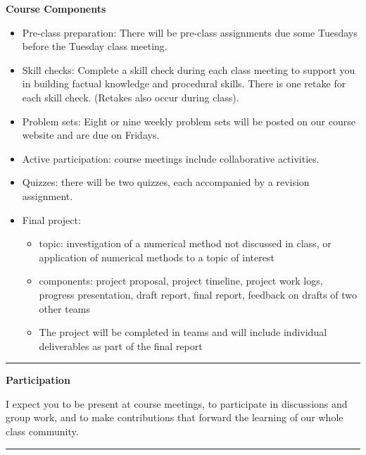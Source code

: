\documentclass[12pt,letterpaper]{exam}
\begin{document}
\noindent\textbf{Course Components}

\begin{itemize}
\itemsep0pt
    \item Pre-class preparation:  There will be pre-class assignments due some Tuesdays before the Tuesday class meeting.
    \item Skill checks: Complete a skill check during each class meeting to support you in building factual knowledge and procedural skills.  There is one retake for each skill check.  (Retakes also occur during class).
    \item Problem sets: Eight or nine weekly problem sets will be posted on our course website and are due on Fridays.
    \item Active participation:  course meetings include collaborative activities.
    \item Quizzes: there will be two quizzes, each accompanied by a revision assignment. 
    \item Final project: 
    \begin{itemize}
    \itemsep0pt
        \item topic: investigation of a numerical method not discussed in class, or application of numerical methods to a topic of interest
        \item components: project proposal, project timeline, project work logs, progress presentation, draft report, final report, feedback on drafts of two other teams
        \item The project will be completed in teams and will include individual deliverables as part of the final report
    \end{itemize}
\end{itemize}

\hrule
\vspace{0.5cm}

\noindent\textbf{Participation}

I expect you to be present at course meetings, to participate in discussions and group work, and to make contributions that forward the learning of our whole class community. %

\vspace{0.5cm}
\hrule
\vspace{0.5cm}
\end{document}
